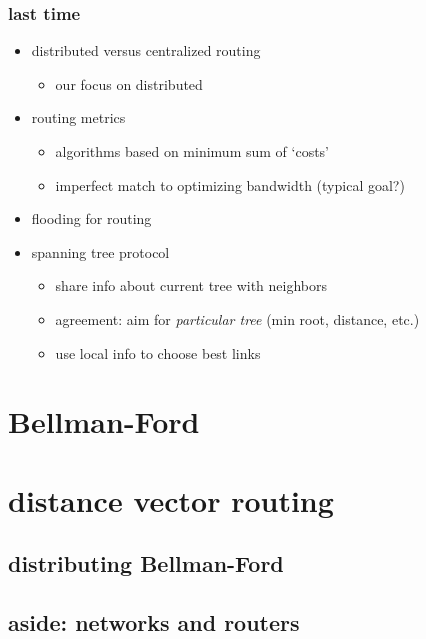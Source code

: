 \date{}
\title{}
\date{}

\begin{frame}
    \titlepage
\end{frame}

\begin{frame}
\frametitle{last time}
\begin{itemize}
    \item distributed versus centralized routing
        \begin{itemize}
        \item our focus on distributed
        \end{itemize}
    \item routing metrics
        \begin{itemize}
        \item algorithms based on minimum sum of `costs'
        \item imperfect match to optimizing bandwidth (typical goal?)
        \end{itemize}
    \item flooding for routing
    \item spanning tree protocol
        \begin{itemize}
        \item share info about current tree with neighbors
        \item agreement: aim for \textit{particular tree} (min root, distance, etc.)
        \item use local info to choose best links
        \end{itemize}
\end{itemize}
\end{frame}

\section{Bellman-Ford}


\section{distance vector routing}
\subsection{distributing Bellman-Ford}


\subsection{aside: networks and routers}
 


